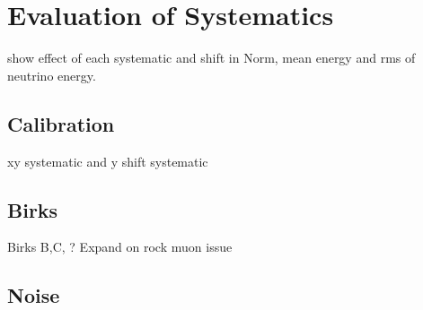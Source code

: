\section{Evaluation of Systematics}\label{sec:systs}
show effect of each systematic and shift in Norm, mean energy and rms of neutrino energy.

\subsection{Calibration}\label{sec:calibsysts}
xy systematic and y shift systematic

\subsection{Birks}\label{sec:birkssysts}
Birks B,C, ?
Expand on rock muon issue 

\subsection{Noise}\label{sec:noisesysts}
